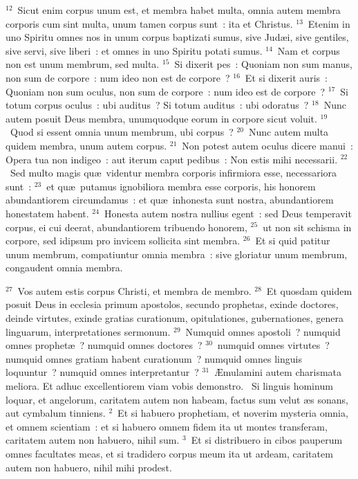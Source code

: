 ${}^{12}$~Sicut enim corpus unum est, et membra habet multa, omnia autem membra corporis cum sint multa, unum tamen corpus sunt~: ita et Christus.
${}^{13}$~Etenim in uno Spiritu omnes nos in unum corpus baptizati sumus, sive Jud\ae i, sive gentiles, sive servi, sive liberi~: et omnes in uno Spiritu potati sumus.
${}^{14}$~Nam et corpus non est unum membrum, sed multa.
${}^{15}$~Si dixerit pes~: Quoniam non sum manus, non sum de corpore~: num ideo non est de corpore~?
${}^{16}$~Et si dixerit auris~: Quoniam non sum oculus, non sum de corpore~: num ideo est de corpore~?
${}^{17}$~Si totum corpus oculus~: ubi auditus~? Si totum auditus~: ubi odoratus~?
${}^{18}$~Nunc autem posuit Deus membra, unumquodque eorum in corpore sicut voluit.
${}^{19}$~Quod si essent omnia unum membrum, ubi corpus~?
${}^{20}$~Nunc autem multa quidem membra, unum autem corpus.
${}^{21}$~Non potest autem oculus dicere manui~: Opera tua non indigeo~: aut iterum caput pedibus~: Non estis mihi necessarii.
${}^{22}$~Sed multo magis qu\ae\ videntur membra corporis infirmiora esse, necessariora sunt~:
${}^{23}$~et qu\ae\ putamus ignobiliora membra esse corporis, his honorem abundantiorem circumdamus~: et qu\ae\ inhonesta sunt nostra, abundantiorem honestatem habent.
${}^{24}$~Honesta autem nostra nullius egent~: sed Deus temperavit corpus, ei cui deerat, abundantiorem tribuendo honorem,
${}^{25}$~ut non sit schisma in corpore, sed idipsum pro invicem sollicita sint membra.
${}^{26}$~Et si quid patitur unum membrum, compatiuntur omnia membra~: sive gloriatur unum membrum, congaudent omnia membra.


${}^{27}$~Vos autem estis corpus Christi, et membra de membro.
${}^{28}$~Et quosdam quidem posuit Deus in ecclesia primum apostolos, secundo prophetas, exinde doctores, deinde virtutes, exinde gratias curationum, opitulationes, gubernationes, genera linguarum, interpretationes sermonum.
${}^{29}$~Numquid omnes apostoli~? numquid omnes prophet\ae~? numquid omnes doctores~?
${}^{30}$~numquid omnes virtutes~? numquid omnes gratiam habent curationum~? numquid omnes linguis loquuntur~? numquid omnes interpretantur~?
${}^{31}$~\AE mulamini autem charismata meliora. Et adhuc excellentiorem viam vobis demonstro.
~Si linguis hominum loquar, et angelorum, caritatem autem non habeam, factus sum velut \ae s sonans, aut cymbalum tinniens.
${}^{2}$~Et si habuero prophetiam, et noverim mysteria omnia, et omnem scientiam~: et si habuero omnem fidem ita ut montes transferam, caritatem autem non habuero, nihil sum.
${}^{3}$~Et si distribuero in cibos pauperum omnes facultates meas, et si tradidero corpus meum ita ut ardeam, caritatem autem non habuero, nihil mihi prodest.


